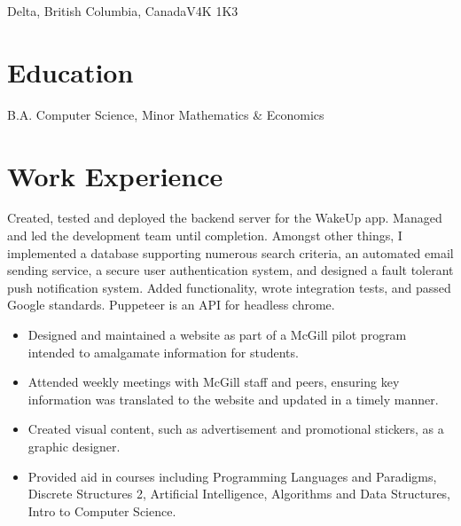 \documentclass{my_cv}
\begin{document}
\newcommand\blfootnote[1]{%
  \begingroup
  \renewcommand\thefootnote{}\footnote{#1}%
  \addtocounter{footnote}{-1}%
  \endgroup
}


\address{5042 45\textsuperscript{th} Avenue}{Delta, British Columbia, Canada}{V4K 1K3}


\section{Education}
B.A. Computer Science, Minor Mathematics \& Economics
\section{Work Experience}

	\workitems
	{Created, tested and deployed the backend server for the WakeUp app. Managed and led the development team until completion.}
	{Amongst other things, I implemented a database supporting numerous search criteria, an automated email sending service, a secure user authentication system, and designed a fault tolerant push notification system.}
	\workitems
	{Added functionality, wrote integration tests, and passed Google standards.}
	{Puppeteer is an API for headless chrome.}
	\begin{itemize}
		\item Designed and maintained a website as part of a McGill pilot program intended to amalgamate information for students.
		\item Attended weekly meetings with McGill staff and peers, ensuring key information was translated to the website and updated in a timely manner.
		\item Created visual content, such as advertisement and promotional stickers, as a graphic designer.
	\end{itemize}
	\begin{itemize}
	\item Provided aid in courses including Programming Languages and Paradigms, Discrete Structures 2, Artificial Intelligence, Algorithms and Data Structures, Intro to Computer Science.
	\end{itemize}
\end{document}
